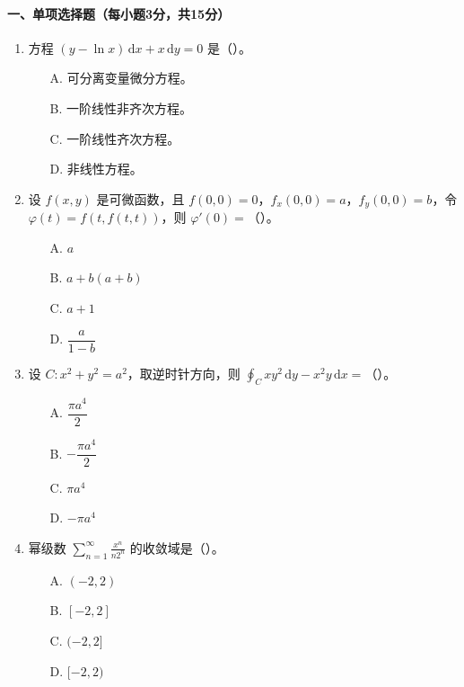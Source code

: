 \paragraph*{一、单项选择题（每小题3分，共15分）}
\begin{enumerate}
  \item 方程 \((y-\ln x)\,\mathrm{d}x+x\,\mathrm{d}y=0\) 是（\quad）。
  \begin{enumerate}
    \item[A.] 可分离变量微分方程。
    \item[B.] 一阶线性非齐次方程。
    \item[C.] 一阶线性齐次方程。
    \item[D.] 非线性方程。
  \end{enumerate}

  \item 设 \(f(x,y)\) 是可微函数，且 \(f(0,0)=0\)，\(f_x(0,0)=a\)，\(f_y(0,0)=b\)，令
  \(\varphi(t)=f(t,f(t,t))\)，则 \(\varphi'(0)=\)（\quad）。
  \begin{enumerate}
    \item[A.] \(a\)
    \item[B.] \(a+b(a+b)\)
    \item[C.] \(a+1\)
    \item[D.] \(\dfrac{a}{1-b}\)
  \end{enumerate}

  \item 设 \(C:x^2+y^2=a^2\)，取逆时针方向，则
  \(\displaystyle \oint_C xy^2\,\mathrm{d}y-x^2y\,\mathrm{d}x=\)（\quad）。
  \begin{enumerate}
    \item[A.] \(\dfrac{\pi a^4}{2}\)
    \item[B.] \(-\dfrac{\pi a^4}{2}\)
    \item[C.] \(\pi a^4\)
    \item[D.] \(-\pi a^4\)
  \end{enumerate}

  \item 幂级数 \(\displaystyle \sum_{n=1}^{\infty}\frac{x^n}{n2^n}\) 的收敛域是（\quad）。
  \begin{enumerate}
    \item[A.] \((-2,2)\)
    \item[B.] \([-2,2]\)
    \item[C.] \((-2,2]\)
    \item[D.] \([-2,2)\)
  \end{enumerate}


\end{enumerate}
